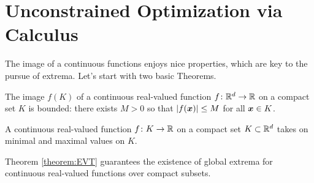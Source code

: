 
\chapter{Unconstrained Optimization via Calculus}


The image of a continuous functions enjoys nice properties, which are key to the pursue of extrema.  Let's start with two basic Theorems.

\begin{theorem}\label{theorem:BVT}
The image $f(K)$ of a continuous real-valued function $f \colon \mathbb{R}^d \to \mathbb{R}$ on a compact set $K$ is bounded: there exists $M>0$ so that $\lvert  f(\boldsymbol{x})  \rvert \leq M$ for all $\boldsymbol{x} \in K$.
\end{theorem}

\begin{theorem}\label{theorem:EVT}
A continuous real-valued function $f \colon K \to \mathbb{R}$ on a compact set $K \subset \mathbb{R}^d$ takes on minimal and maximal values on $K$.
\end{theorem}

Theorem \ref{theorem:EVT} guarantees the existence of global extrema for continuous real-valued functions over compact subsets.  %





